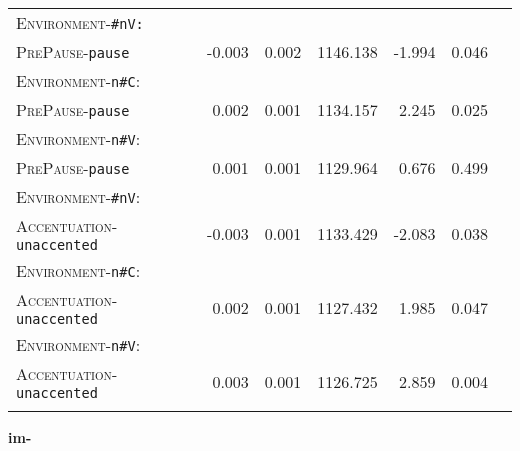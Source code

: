 \begin{table}
{\begin{tabular} {lrrrrrr}
		\textsc{Environment}-\texttt{\#nV:}&&&&&\\
		\textsc{PrePause}-\texttt{pause} & -0.003 & 0.002 & 1146.138 & -1.994 & 0.046 \\ 
		
		\textsc{Environment}-\texttt{n\#C}:&&&&&\\
		\textsc{PrePause}-\texttt{pause} & 0.002 & 0.001 & 1134.157 & 2.245 & 0.025 \\ 
		
		\textsc{Environment}-\texttt{n\#V}:&&&&&\\
		\textsc{PrePause}-\texttt{pause} & \color{lsLightGray} 0.001 & \color{lsLightGray} 0.001 & \color{lsLightGray} 1129.964 & \color{lsLightGray} 0.676 & \color{lsLightGray} 0.499 \\ 
		
		\textsc{Environment}-\texttt{\#nV}:&&&&&\\
		\textsc{Accentuation}-\texttt{unaccented} & -0.003 & 0.001 & 1133.429 & -2.083 & 0.038 \\ 
		
		\textsc{Environment}-\texttt{n\#C}:&&&&&\\
		\textsc{Accentuation}-\texttt{unaccented} & 0.002 & 0.001 & 1127.432 & 1.985 & 0.047 \\ 
		
		\textsc{Environment}-\texttt{n\#V}:&&&&&\\
		\textsc{Accentuation}-\texttt{unaccented} & 0.003 & 0.001 & 1126.725 & 2.859 & 0.004 \\ 
		\lspbottomrule 
			\end{tabular}
}


\end{table}
\vspace*{-0.3cm}

\clearpage

\textbf{{im-}}

